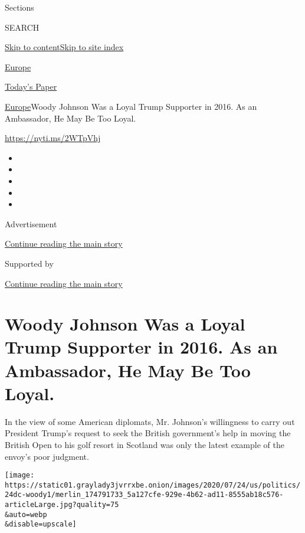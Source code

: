 Sections

SEARCH

\protect\hyperlink{site-content}{Skip to
content}\protect\hyperlink{site-index}{Skip to site index}

\href{https://www.nytimes3xbfgragh.onion/section/world/europe}{Europe}

\href{https://myaccount.nytimes3xbfgragh.onion/auth/login?response_type=cookie\&client_id=vi}{}

\href{https://www.nytimes3xbfgragh.onion/section/todayspaper}{Today's
Paper}

\href{/section/world/europe}{Europe}\textbar{}Woody Johnson Was a Loyal
Trump Supporter in 2016. As an Ambassador, He May Be Too Loyal.

\url{https://nyti.ms/2WTpVhj}

\begin{itemize}
\item
\item
\item
\item
\item
\end{itemize}

Advertisement

\protect\hyperlink{after-top}{Continue reading the main story}

Supported by

\protect\hyperlink{after-sponsor}{Continue reading the main story}

\hypertarget{woody-johnson-was-a-loyal-trump-supporter-in-2016-as-an-ambassador-he-may-be-too-loyal}{%
\section{Woody Johnson Was a Loyal Trump Supporter in 2016. As an
Ambassador, He May Be Too
Loyal.}\label{woody-johnson-was-a-loyal-trump-supporter-in-2016-as-an-ambassador-he-may-be-too-loyal}}

In the view of some American diplomats, Mr. Johnson's willingness to
carry out President Trump's request to seek the British government's
help in moving the British Open to his golf resort in Scotland was only
the latest example of the envoy's poor judgment.

\texttt{[image: https://static01.graylady3jvrrxbe.onion/images/2020/07/24/us/politics/24dc-woody1/merlin\_174791733\_5a127cfe-929e-4b62-ad11-8555ab18c576-articleLarge.jpg?quality=75\\\&auto=webp\\\&disable=upscale]}

